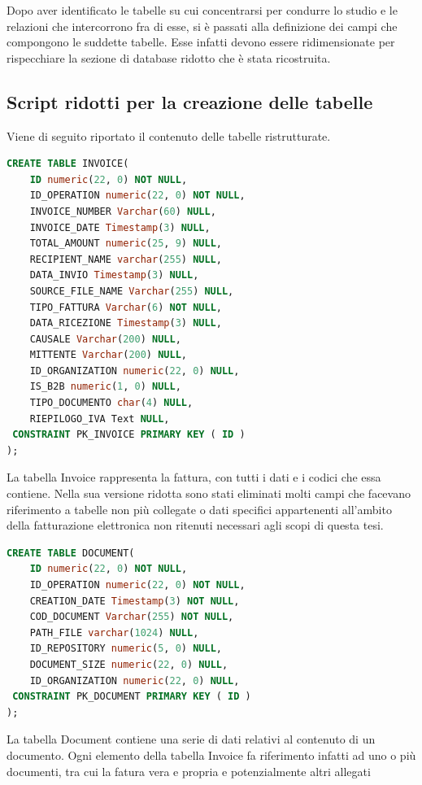 \noindent Dopo aver identificato le tabelle su cui concentrarsi per condurre lo studio e le relazioni che intercorrono fra di esse, si è passati alla definizione dei campi che compongono le suddette tabelle. Esse infatti devono essere ridimensionate per rispecchiare la sezione di database ridotto che è stata ricostruita.\\

\subsection{Script ridotti per la creazione delle tabelle}
Viene di seguito riportato il contenuto delle tabelle ristrutturate.\\

\begin{lstlisting}[language=SQL,
        deletekeywords={IDENTITY,INT},
        morekeywords={clustered},    
        framesep=10pt,
        framextopmargin=10pt, style=sql_style]
CREATE TABLE INVOICE(
    ID numeric(22, 0) NOT NULL,
    ID_OPERATION numeric(22, 0) NOT NULL,
    INVOICE_NUMBER Varchar(60) NULL,
    INVOICE_DATE Timestamp(3) NULL,
    TOTAL_AMOUNT numeric(25, 9) NULL,
    RECIPIENT_NAME varchar(255) NULL,
    DATA_INVIO Timestamp(3) NULL,
    SOURCE_FILE_NAME Varchar(255) NULL,
    TIPO_FATTURA Varchar(6) NOT NULL,
    DATA_RICEZIONE Timestamp(3) NULL,
    CAUSALE Varchar(200) NULL,
    MITTENTE Varchar(200) NULL,
    ID_ORGANIZATION numeric(22, 0) NULL,
    IS_B2B numeric(1, 0) NULL,
    TIPO_DOCUMENTO char(4) NULL,
    RIEPILOGO_IVA Text NULL,
 CONSTRAINT PK_INVOICE PRIMARY KEY ( ID )
);
\end{lstlisting}
\noindent La tabella Invoice rappresenta la fattura, con tutti i dati e i codici che essa contiene. Nella sua versione ridotta sono stati eliminati molti campi che facevano riferimento a tabelle non più collegate o dati specifici appartenenti all'ambito della fatturazione elettronica non ritenuti necessari agli scopi di questa tesi.\\

\begin{lstlisting}[language=SQL,
        deletekeywords={IDENTITY,INT},
        morekeywords={clustered},    
        framesep=10pt,
        framextopmargin=10pt, style=sql_style]
CREATE TABLE DOCUMENT(
    ID numeric(22, 0) NOT NULL,
    ID_OPERATION numeric(22, 0) NOT NULL,
    CREATION_DATE Timestamp(3) NOT NULL,
    COD_DOCUMENT Varchar(255) NOT NULL,
    PATH_FILE varchar(1024) NULL,
    ID_REPOSITORY numeric(5, 0) NULL,
    DOCUMENT_SIZE numeric(22, 0) NULL,
    ID_ORGANIZATION numeric(22, 0) NULL,
 CONSTRAINT PK_DOCUMENT PRIMARY KEY ( ID )
);
\end{lstlisting}
\noindent La tabella Document contiene una serie di dati relativi al contenuto di un documento. Ogni elemento della tabella Invoice fa riferimento infatti ad uno o più documenti, tra cui la fatura vera e propria e potenzialmente altri allegati\\


